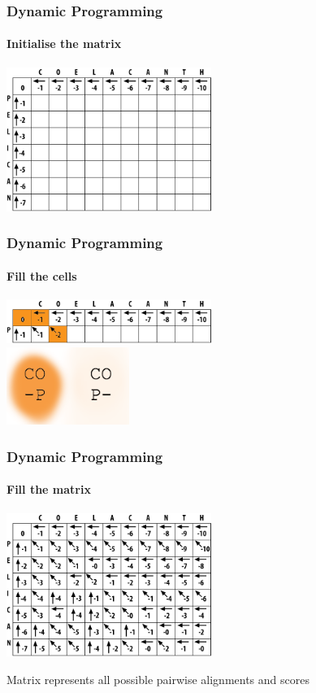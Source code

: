 \documentclass[table]{beamer}
\begin{document}
    \begin{frame}
     \frametitle{Dynamic Programming}
     \framesubtitle{Initialise the matrix}
       \begin{center}
         \includegraphics[width=0.5\textwidth]{images/initialise}
       \end{center}
    \end{frame}   
   
    \begin{frame}
     \frametitle{Dynamic Programming}
     \framesubtitle{Fill the cells}
       \begin{center}
         \includegraphics[width=0.5\textwidth]{images/fill_start} \\
         \includegraphics[width=0.3\textwidth]{images/fill_start_letters}
       \end{center}
    \end{frame}     

    \begin{frame}
     \frametitle{Dynamic Programming}
     \framesubtitle{Fill the matrix}
       \begin{center}
         \includegraphics[width=0.5\textwidth]{images/full_matrix}
       \end{center}
       Matrix represents all possible pairwise alignments and scores
    \end{frame}  
   
\end{document}
